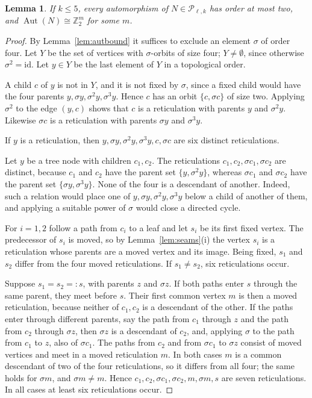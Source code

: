 \documentclass[11pt,a4paper]{article}
\newtheorem{lemma}[theorem]{Lemma}
\theoremstyle{definition}
\newcommand{\Aut}{\operatorname{Aut}}
\newcommand{\cP}{\mathcal{P}}
\begin{document}
\begin{lemma}\label{lem:exponent2}
If $k\le5$, every automorphism of $N\in\cP_{\ell,k}$ has order at most two, and $\Aut(N)\cong\mathbb{Z}_2^m$ for some $m$.
\end{lemma}

\begin{proof}
By Lemma~\ref{lem:autbound} it suffices to exclude an element $\sigma$ of order four. Let $Y$ be the set of vertices with $\sigma$-orbits of size four; $Y\neq\emptyset$, since otherwise $\sigma^2=\mathrm{id}$. Let $y\in Y$ be the last element of $Y$ in a topological order.

A child $c$ of $y$ is not in $Y$, and it is not fixed by $\sigma$, since a fixed child would have the four parents $y,\sigma y,\sigma^2y,\sigma^3y$. Hence $c$ has an orbit $\{c,\sigma c\}$ of size two. Applying $\sigma^2$ to the edge $(y,c)$ shows that $c$ is a reticulation with parents $y$ and $\sigma^2y$. Likewise $\sigma c$ is a reticulation with parents $\sigma y$ and $\sigma^3y$.

If $y$ is a reticulation, then $y,\sigma y,\sigma^2y,\sigma^3y,c,\sigma c$ are six distinct reticulations.

Let $y$ be a tree node with children $c_1,c_2$. The reticulations $c_1,c_2,\sigma c_1,\sigma c_2$ are distinct, because $c_1$ and $c_2$ have the parent set $\{y,\sigma^2y\}$, whereas $\sigma c_1$ and $\sigma c_2$ have the parent set $\{\sigma y,\sigma^3y\}$. None of the four is a descendant of another. Indeed, such a relation would place one of $y,\sigma y,\sigma^2y,\sigma^3y$ below a child of another of them, and applying a suitable power of $\sigma$ would close a directed cycle.

For $i=1,2$ follow a path from $c_i$ to a leaf and let $s_i$ be its first fixed vertex. The predecessor of $s_i$ is moved, so by Lemma~\ref{lem:seams}(i) the vertex $s_i$ is a reticulation whose parents are a moved vertex and its image. Being fixed, $s_1$ and $s_2$ differ from the four moved reticulations. If $s_1\neq s_2$, six reticulations occur.

Suppose $s_1=s_2=:s$, with parents $z$ and $\sigma z$. If both paths enter $s$ through the same parent, they meet before $s$. Their first common vertex $m$ is then a moved reticulation, because neither of $c_1,c_2$ is a descendant of the other. If the paths enter through different parents, say the path from $c_1$ through $z$ and the path from $c_2$ through $\sigma z$, then $\sigma z$ is a descendant of $c_2$, and, applying $\sigma$ to the path from $c_1$ to $z$, also of $\sigma c_1$. The paths from $c_2$ and from $\sigma c_1$ to $\sigma z$ consist of moved vertices and meet in a moved reticulation $m$. In both cases $m$ is a common descendant of two of the four reticulations, so it differs from all four; the same holds for $\sigma m$, and $\sigma m\neq m$. Hence $c_1,c_2,\sigma c_1,\sigma c_2,m,\sigma m,s$ are seven reticulations. In all cases at least six reticulations occur.
\end{proof}
\end{document}
